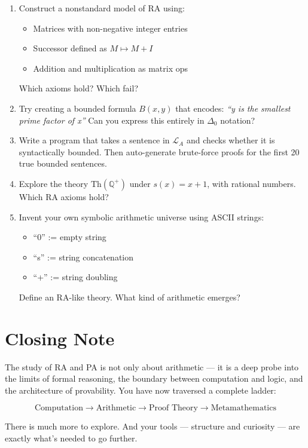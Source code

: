 \documentclass[12pt]{article}
\begin{document}
\begin{enumerate}[label=\textbf{D\arabic*.}]
  \item Construct a nonstandard model of RA using:
    \begin{itemize}
      \item Matrices with non-negative integer entries
      \item Successor defined as \( M \mapsto M + I \)
      \item Addition and multiplication as matrix ops
    \end{itemize}
    Which axioms hold? Which fail?

  \item Try creating a bounded formula \( B(x, y) \) that encodes:
    \textit{“y is the smallest prime factor of x”}  
    Can you express this entirely in \( \Delta_0 \) notation?

  \item Write a program that takes a sentence in \( \mathcal{L}_A \) and checks whether it is syntactically bounded. Then auto-generate brute-force proofs for the first 20 true bounded sentences.

  \item Explore the theory \( \text{Th}(\mathbb{Q}^+) \) under \( s(x) = x + 1 \), with rational numbers. Which RA axioms hold?

  \item Invent your own symbolic arithmetic universe using ASCII strings:
    \begin{itemize}
      \item “0” := empty string
      \item “s” := string concatenation
      \item “+” := string doubling
    \end{itemize}
    Define an RA-like theory. What kind of arithmetic emerges?
\end{enumerate}

\section*{Closing Note}

The study of RA and PA is not only about arithmetic — it is a deep probe into the limits of formal reasoning, the boundary between computation and logic, and the architecture of provability. You have now traversed a complete ladder:

\[
\text{Computation} \rightarrow \text{Arithmetic} \rightarrow \text{Proof Theory} \rightarrow \text{Metamathematics}
\]

There is much more to explore. And your tools — structure and curiosity — are exactly what’s needed to go further.
\end{document}
